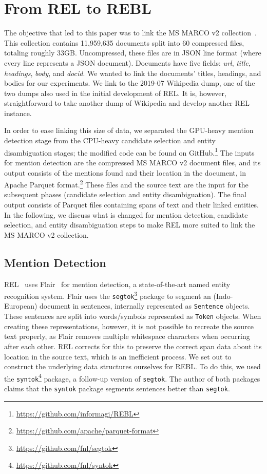 \section{From REL to REBL}
The objective that led to this paper was to link the MS MARCO v2 collection~\cite{msmarco}. This collection contains 11,959,635 documents split into 60 compressed files, totaling roughly 33GB. Uncompressed, these files are in JSON line format (where every line represents a JSON document). Documents have five fields: \textit{url}, \textit{title}, \textit{headings}, \textit{body}, and \textit{docid}. We wanted to link the documents' titles, headings, and bodies for our experiments. We link to the 2019-07 Wikipedia dump, one of the two dumps also used in the initial development of REL. It is, however, straightforward to take another dump of Wikipedia and develop another REL instance. 

In order to ease linking this size of data, we separated the GPU-heavy mention detection stage from the CPU-heavy candidate selection and entity disambiguation stages; the modified code can be found on GitHub.\footnote{\url{https://github.com/informagi/REBL}}
The inputs for mention detection are the compressed MS MARCO v2 document files, and its output consists of the mentions found and their location in the document, in Apache Parquet format.\footnote{\url{https://github.com/apache/parquet-format}}
These files and the source text are the input for the subsequent phases (candidate selection and entity disambiguation). The final output consists of Parquet files containing spans of text and their linked entities. 
In the following, we discuss what is changed for mention detection, candidate selection, and entity disambiguation steps to make REL more suited to link the MS MARCO v2 collection.  

\subsection{Mention Detection}
REL~\cite{REL} uses Flair~\cite{flair} for mention detection, a state-of-the-art named entity recognition system. Flair uses the \texttt{segtok}\footnote{\url{https://github.com/fnl/segtok}} package to segment an (Indo-European) document in sentences, internally represented as \texttt{Sentence} objects. These sentences are split into words/symbols represented as \texttt{Token} objects. When creating these representations, however, it is not possible to recreate the source text properly, as Flair removes multiple whitespace characters when occurring after each other. REL corrects for this to preserve the correct span data about its location in the source text, which is an inefficient process.
We set out to construct the underlying data structures ourselves for REBL. To do this, we used the \texttt{syntok}\footnote{\url{https://github.com/fnl/syntok}} package, a follow-up version of \texttt{segtok}. The author of both packages claims that the \texttt{syntok} package segments sentences better than \texttt{segtok}. 

